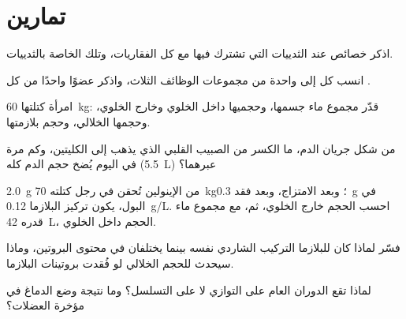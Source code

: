 \section{تمارين}

\begin{exercise}[$\star$]\label{exo:b1:mammal-organization:1}
اذكر خصائص  عند الثدييات التي تشترك فيها مع كل
الفقاريات، وتلك الخاصة بالثدييات.
\end{exercise}

\begin{exercise}[$\star$]\label{exo:b1:mammal-organization:2}
انسب كل  إلى واحدة من مجموعات الوظائف الثلاث، واذكر عضوًا واحدًا
من كل .
\end{exercise}

\begin{exercise}[$\star$]\label{exo:b1:mammal-organization:3}
امرأة كتلتها \qty{60}{kg}: قدّر مجموع ماء جسمها، وحجميها داخل الخلوي
وخارج الخلوي، وحجمها الخلالي، وحجم بلازمتها.
\end{exercise}

\begin{exercise}[$\star$]\label{exo:b1:mammal-organization:4}
من شكل جريان الدم، ما الكسر من الصبيب القلبي الذي يذهب إلى
الكليتين، وكم مرة في اليوم يُضخ حجم الدم كله (\qty{5.5}{L}) عبرهما؟
\end{exercise}

\begin{exercise}[$\star\star$]\label{exo:b1:mammal-organization:5}
\qty{2.0}{g} من الإينولين تُحقن في رجل كتلته \qty{70}{kg}؛ وبعد
الامتزاج، وبعد فقد \qty{0.3}{g} في البول، يكون تركيز البلازما
\qty{0.12}{g/L}. احسب الحجم خارج الخلوي، ثم، مع مجموع ماء قدره
\qty{42}{L}، الحجم داخل الخلوي.
\end{exercise}

\begin{exercise}[$\star\star$]\label{exo:b1:mammal-organization:6}
فسّر لماذا كان للبلازما  التركيب الشاردي نفسه بينما
يختلفان في محتوى البروتين، وماذا سيحدث للحجم الخلالي لو فُقدت
بروتينات البلازما.
\end{exercise}

\begin{exercise}[$\star\star$]\label{exo:b1:mammal-organization:7}
لماذا تقع  الدوران العام على التوازي لا على التسلسل؟ وما نتيجة
وضع الدماغ في مؤخرة العضلات؟
\end{exercise}

